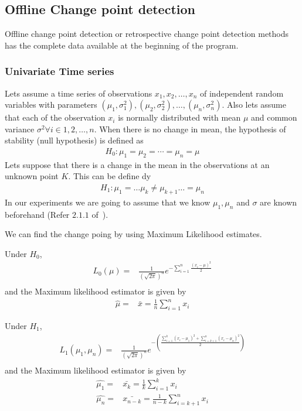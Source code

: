 \documentclass{article}
\begin{document}
\subsection{Offline Change point detection}
Offline change point detection or retrospective change point detection methods has the complete data available at the beginning of the program.

\subsubsection{Univariate Time series}
Lets assume a time series of observations $x_{1}, x_{2}, \ldots, x_{n} $ of independent random variables with parameters $(\mu_{1}, \sigma_{1}^{2}), (\mu_{2}, \sigma_{2}^{2}), \ldots, (\mu_{n}, \sigma_{n}^{2}) $.
Also lets assume that each of the observation $ x_{i} $ is normally distributed with mean $ \mu $ and common variance $\sigma^{2} \forall i \in 1, 2, \ldots ,n $.
When there is no change in mean, the hypothesis of stability (null hypothesis) is defined as
\begin{align}
  H_{0} : \mu_{1} = \mu_{2} = \cdots =  \mu_{n} = \mu
\end{align}
Lets suppose that there is a change in the mean in the observations at an unknown point $ K $.  This can be define dy
\begin{align}
  H_{1} : \mu_{1} = \ldots \mu_{k} \ne \mu_{k+1} \ldots =  \mu_{n}
\end{align}
In our experiments we are going to assume that we know $\mu_{1}, \mu_{n} $ and $ \sigma $ are known beforehand (Refer $2.1.1$ of~\cite{birkhauser_pscpa}).

We can find the change poing by using Maximum Likelihood estimates.

Under $H_{0} $,
\begin{align}
  L_{0}(\mu) =& \frac{1}{{(\sqrt{2\pi})}^n} e^{-\sum_{i=1}^{n} \frac{{(x_{i} - \mu)}^2}{2} } \\
\end{align}
and the Maximum likelihood estimator is given by
\begin{align}
  \hat{\mu} =& \bar{x} = \frac{1}{n}\sum_{i=1}^{n} x_{i}
\end{align}

Under $H_{1} $,
\begin{align}
  L_{1}(\mu_{1}, \mu_{n}) =& \frac{1}{{(\sqrt{2\pi})}^n} e^{-(\frac{\sum_{i=1}^{k} {(x_{i} - \mu_{1})}^2 + \sum_{i=k+1}^{n} {(x_{i} - \mu_{n})}^2}{2})} \\
\end{align}
and the Maximum likelihood estimator is given by
\begin{align}
  \hat{\mu_{1}} =& \bar{x_{k}} = \frac{1}{k}\sum_{i=1}^{k} x_{i} \\
  \hat{\mu_{n}} =& \bar{x_{n-k}} = \frac{1}{n-k}\sum_{i=k+1}^{n} x_{i} 
\end{align}
\end{document}
